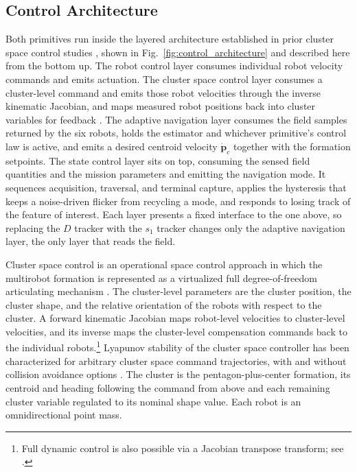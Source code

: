 \documentclass[lettersize,journal]{IEEEtran}
\begin{document}
\subsection{Control Architecture}
\label{sec:arch}

Both primitives run inside the layered architecture established in
prior cluster space control studies \cite{8,31}, shown in
Fig.~\ref{fig:control_architecture} and described here from the bottom
up. The robot control layer consumes individual robot velocity
commands and emits actuation. The cluster space control layer consumes
a cluster-level command and emits those robot velocities through the
inverse kinematic Jacobian, and maps measured robot positions back
into cluster variables for feedback \cite{31,32}. The adaptive
navigation layer consumes the field samples returned by the six
robots, holds the estimator and
whichever primitive's control law is active, and emits a desired
centroid velocity $\dot{\mathbf{p}}_c$ together with the formation
setpoints. The state control layer sits on top, consuming the sensed
field quantities and the mission parameters and emitting the navigation
mode. It sequences acquisition, traversal, and terminal capture, applies
the hysteresis that keeps a noise-driven flicker from recycling a mode,
and responds to losing track of the feature of interest. Each layer
presents a fixed interface to the one above, so replacing the $D$
tracker with the $s_1$ tracker changes only the adaptive navigation
layer, the only layer that reads the field.

Cluster space control is an operational space control approach in
which the multirobot formation is represented as a virtualized full
degree-of-freedom articulating mechanism \cite{31}. The cluster-level
parameters are the cluster position, the cluster shape, and the
relative orientation of the robots with respect to the cluster. A
forward kinematic Jacobian maps robot-level velocities to cluster-level
velocities, and its inverse maps the cluster-level compensation
commands back to the individual robots.\footnote{Full dynamic control
is also possible via a Jacobian transpose transform; see \cite{31}.}
Lyapunov stability of the cluster space controller has been
characterized for arbitrary cluster space command trajectories, with
and without collision avoidance options \cite{32}. The cluster is the
pentagon-plus-center formation, its centroid
and heading following the command from above and each remaining cluster
variable regulated to its nominal shape value. Each robot is an
omnidirectional point mass.
\end{document}

